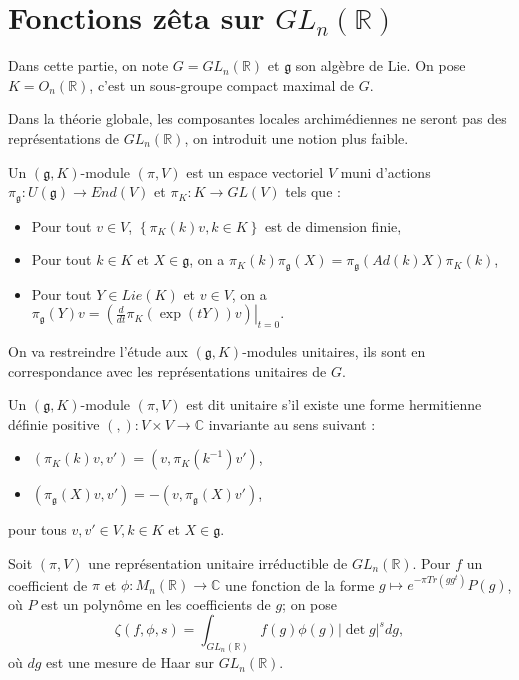 \section{Fonctions zêta sur $GL_n(\mathbb{R})$}

Dans cette partie, on note $G=GL_n(\mathbb{R})$ et $\mathfrak{g}$ son algèbre de Lie. On pose $K=O_n(\mathbb{R})$, c'est un sous-groupe compact maximal de $G$.

Dans la théorie globale, les composantes locales archimédiennes ne seront pas des représentations de $GL_n(\mathbb{R})$, on introduit une notion plus faible.

\begin{definition}
Un $(\mathfrak{g}, K)$-module $(\pi, V)$ est un espace vectoriel $V$ muni d'actions $\pi_\mathfrak{g} : U(\mathfrak{g}) \rightarrow End(V)$ et $\pi_K : K \rightarrow GL(V)$ tels que :
\begin{itemize}
\item Pour tout $v \in V$, $\left\lbrace \pi_K(k)v, k \in K \right\rbrace$ est de dimension finie,
\item Pour tout $k \in K$ et $X \in \mathfrak{g}$, on a
$\pi_K(k)\pi_\mathfrak{g}(X) = \pi_\mathfrak{g}(Ad(k)X)\pi_K(k)$,
\item Pour tout $Y \in Lie(K)$ et $v \in V$, on a
$\pi_\mathfrak{g}(Y)v = \left.\left(\frac{d}{dt}\pi_K(\exp(tY))v\right)\right|_{t=0}.$
\end{itemize}
\end{definition}

On va restreindre l'étude aux $(\mathfrak{g}, K)$-modules unitaires, ils sont en correspondance avec les représentations unitaires de $G$.

\begin{definition}
Un $(\mathfrak{g}, K)$-module $(\pi, V)$ est dit unitaire s'il existe une forme hermitienne définie positive $(,) : V \times V \rightarrow \mathbb{C}$ invariante au sens suivant :
\begin{itemize}
\item $(\pi_K(k)v, v') = (v, \pi_K(k^{-1})v')$,
\item $(\pi_\mathfrak{g}(X)v, v') = -(v, \pi_\mathfrak{g}(X)v')$,
\end{itemize}
pour tous $v, v' \in V, k \in K$ et $X \in \mathfrak{g}$.
\end{definition}

Soit $(\pi, V)$ une représentation unitaire irréductible de $GL_n(\mathbb{R})$. Pour $f$ un coefficient de $\pi$ et $\phi : M_n(\mathbb{R}) \rightarrow \mathbb{C}$ une fonction de la forme
$g \mapsto e^{-\pi Tr(gg^t)}P(g)$, où $P$ est un polynôme en les coefficients de $g$; on pose
\begin{equation}
\zeta(f, \phi, s) = \int_{GL_n(\mathbb{R})} f(g) \phi(g) |\det g|^s dg,
\end{equation}
où $dg$ est une mesure de Haar sur $GL_n(\mathbb{R})$.


